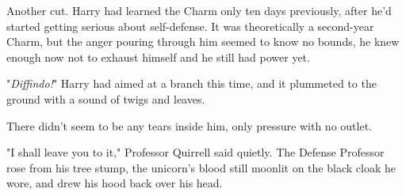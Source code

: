 Another cut. Harry had learned the Charm only ten days previously, after he'd 
started getting serious about self-defense. It was theoretically a second-year 
Charm, but the anger pouring through him seemed to know no bounds, he knew 
enough now not to exhaust himself and he still had power yet.

"\emph{Diffindo!}" Harry had aimed at a branch this time, and it plummeted to 
the ground with a sound of twigs and leaves.

There didn't seem to be any tears inside him, only pressure with no outlet.

"I shall leave you to it," Professor Quirrell said quietly. The Defense 
Professor rose from his tree stump, the unicorn's blood still moonlit on the 
black cloak he wore, and drew his hood back over his head.
